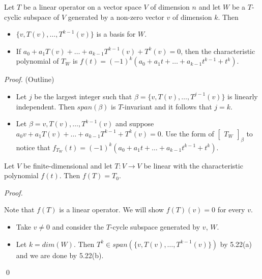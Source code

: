 \documentclass[12pt]{article}
\newenvironment{theorem}[2][Theorem]{\begin{trivlist}
\item[\hskip \labelsep {\bfseries #1}\hskip \labelsep {\bfseries #2.}]}{\end{trivlist}}
\newenvironment{sol}
    {\emph{Proof.}
    }
    {
    \qed
    }
\begin{document}
\begin{theorem}{5.22}
Let $T$ be a linear operator on a vector space $V$ of dimension $n$ and let $W$ be a $T$-cyclic subspace of $V$ generated by a non-zero vector $v$ of dimension $k$. Then

\begin{itemize}
    \item[(a)] $\{v, T(v), \dots, T^{k - 1}(v)\}$ is a basis for $W$. 
    
    \item[(b)] If $a_0 + a_1T(v) + \dots + a_{k-1}T^{k-1}(v) + T^k(v) = 0$, then the characteristic polynomial of $T_W$ is $f(t) = (-1)^k(a_0 + a_1t + \dots + a_{k-1}t^{k-1} + t^k)$.
\end{itemize}
\end{theorem}

\textit{Proof.} (Outline)
\begin{itemize}
    \item[(a)] Let $j$ be the largest integer such that $\beta = \{v, T(v), \dots, T^{j - 1}(v)\}$ is linearly independent. Then $span(\beta)$ is $T$-invariant and it follows that $j = k$.
    
    \item[(b)] Let $\beta = v, T(v), \dots, T^{k - 1}(v)$ and suppose $a_0v + a_1T(v) + \dots + a_{k - 1}T^{k-1} + T^k(v) = 0$. Use the form of $\begin{bmatrix}
    T_W
    \end{bmatrix}_\beta$ to notice that $f_{T_W}(t) = (-1)^k(a_0 + a_1t + \dots + a_{k-1}t^{k-1} + t^k)$.
\end{itemize}

\begin{theorem}{5.23, Cayley-Hamilton}
Let $V$ be finite-dimensional and let $T : V \to V$ be linear with the characteristic polynomial $f(t)$. Then $f(T) = T_0$.
\end{theorem}

\begin{sol}
Note that $f(T)$ is a linear operator. We will show $f(T)(v) = 0$ for every $v$.

\begin{itemize}
    \item Take $v \neq 0$ and consider the $T$-cycle subspace generated by $v$, $W$.
    
    \item Let $k = dim(W)$. Then $T^k \in span(\{v, T(v), \dots, T^{k-1}(v)\})$ by 5.22(a) and we are done by 5.22(b).
\end{itemize}
\end{sol}
\end{document}
